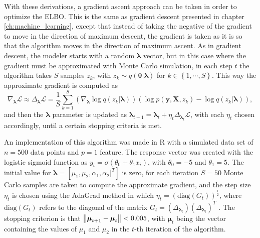 With these derivations, a gradient ascent approach can be taken in order to optimize the ELBO. This is the same as gradient descent presented in chapter \ref{ch:machine_learning}, except that instead of taking the negative of the gradient to move in the direction of maximum descent, the gradient is taken as it is so that the algorithm moves in the direction of maximum ascent. As in gradient descent, the modeler starts with a random $\boldsymbol{\lambda}$ vector, but in this case where the gradient must be approximated with Monte Carlo simulation, in each step $t$ the algorithm takes $S$ samples $z_k$, with $z_k \sim q(\boldsymbol{\theta} | \boldsymbol{\lambda})$ for $k \in \left\{1, \cdots, S \right\}$. This way the approximate gradient is computed as
\begin{equation}
  \nabla_{\boldsymbol{\lambda}} \mathcal{L} \approx \Delta_{\boldsymbol{\lambda}} \mathcal{L} = \frac{1}{S} \sum_{k = 1}^S \left( \nabla_{\boldsymbol{\lambda}} \log q(z_k | \boldsymbol{\lambda}) \right) \left( \log p(\boldsymbol{y}, \boldsymbol{X}, z_k) - \log q(z_k | \boldsymbol{\lambda}) \right),
\end{equation}
and then the $\boldsymbol{\lambda}$ parameter is updated as $\boldsymbol{\lambda}_{t+1} = \boldsymbol{\lambda}_{t} + \eta_t  \Delta_{\boldsymbol{\lambda}_t} \mathcal{L}$, with each $\eta_t$ chosen accordingly, until a certain stopping criteria is met.

An implementation of this algorithm was made in R with a simulated data set of $n = 500$ data points and $p = 1$ feature. The response vector was created with the logistic sigmoid function as $y_i = \sigma(\theta_0 + \theta_1 x_i)$, with $\theta_0 = -5$ and $\theta_1 = 5$. The initial value for $\boldsymbol{\lambda} = \left[ \mu_1, \mu_2, \alpha_1, \alpha_2 ]^T \right]$ is zero, for each iteration $S = 50$ Monte Carlo samples are taken to compute the approximate gradient, and the step size $\eta_t$ is chosen using the AdaGrad method in which
$\eta_t = \left( \mathrm{diag}(G_t) \right)^{\frac{1}{2}}$, where $\mathrm{diag}(G_t)$ refers to the diagonal of the matrix $G_t = \left( \Delta_{\boldsymbol{\lambda}_t} \right) \left( \Delta_{\boldsymbol{\lambda}_t} \right)^T$ \cite{duchi2011adaptive}. The stopping criterion is that
$\left\lVert \boldsymbol{\mu}_{t+1} - \boldsymbol{\mu}_{t} \right\rVert < 0.005$,
with $\boldsymbol{\mu}_t$ being the vector containing the values of $\mu_1$ and $\mu_2$ in the $t$-th iteration of the algorithm.

